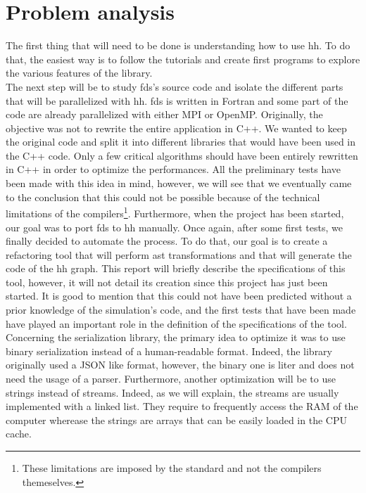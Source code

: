 
\clearpage{}
\section{Problem analysis}

The first thing that will need to be done is understanding how to use \gls{hh}.
To do that, the easiest way is to follow the tutorials and create first programs
to explore the various features of the library.\\

The next step will be to study \gls{fds}'s source code and isolate the different
parts that will be parallelized with \gls{hh}. \gls{fds} is written in Fortran
and some part of the code are already parallelized with either MPI or OpenMP.
Originally, the objective was not to rewrite the entire application in C++. We
wanted to keep the original code and split it into different libraries that
would have been used in the C++ code. Only a few critical algorithms should have
been entirely rewritten in C++ in order to optimize the performances. All the
preliminary tests have been made with this idea in mind, however, we will see
that we eventually came to the conclusion that this could not be possible
because of the technical limitations of the compilers\footnote{These limitations
are imposed by the standard and not the compilers themeselves.}. Furthermore,
when the project has been started, our goal was to port \gls{fds} to \gls{hh}
manually. Once again, after some first tests, we finally decided to automate the
process. To do that, our goal is to create a refactoring tool that will perform
\gls{ast} transformations and that will generate the code of the \gls{hh} graph.
This report will briefly describe the specifications of this tool, however, it
will not detail its creation since this project has just been started. It is
good to mention that this could not have been predicted without a prior
knowledge of the simulation's code, and the first tests that have been made have
played an important role in the definition of the specifications of the tool.\\

Concerning the serialization library, the primary idea to optimize it was to use
binary serialization instead of a human-readable format. Indeed, the library
originally used a JSON like format, however, the binary one is liter and does
not need the usage of a \gls{parser}. Furthermore, another optimization will be
to use strings instead of streams. Indeed, as we will explain, the streams are
usually implemented with a linked list. They require to frequently access the
RAM of the computer wherease the strings are arrays that can be easily loaded in
the CPU cache.\\

